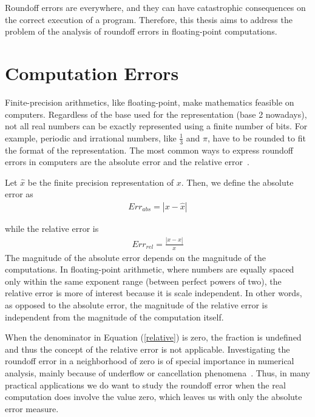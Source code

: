 Roundoff errors are everywhere, and they can have catastrophic consequences on the correct execution of a program.
%
Therefore, this thesis aims to address the problem of the analysis of roundoff errors in floating-point computations.
%
\section{Computation Errors}
%

Finite-precision arithmetics, like floating-point, make mathematics feasible on computers. 
%
Regardless of the base used for the representation (base 2 nowadays), not all real numbers can be exactly represented using a finite number of bits.
%
For example, periodic and irrational numbers, like $\frac{1}{3}$ and $\pi$, have to be rounded to fit the format of the representation. 
%
%
%
The most common ways to express roundoff errors in computers are the absolute error and the relative error~\cite{higham2002accuracy}.
%

Let $\widehat{x}$ be the finite precision representation of $x$. Then, we define the absolute error as
%
\begin{align}
Err_{abs}=|x-\widehat{x}|\label{absolute}
\end{align}
%

while the relative error is
%
\begin{align}
Err_{rel}=\frac{|x-\widehat{x}|}{x}\label{relative}
\end{align}
%
The magnitude of the absolute error depends on the magnitude of the computations.
%
In floating-point arithmetic, where numbers are equally spaced only within the same exponent range (between perfect powers of two), the relative error is more of interest because it is scale independent.
%
In other words, as opposed to the absolute error, the magnitude of the relative error is independent from the magnitude of the computation itself.
%

%
When the denominator in Equation (\ref{relative}) is zero, the fraction is undefined and thus the concept of the relative error is not applicable.
%
Investigating the roundoff error in a neighborhood of zero is of special importance in numerical analysis, mainly because of underflow or cancellation phenomena~\cite{every}. Thus, in many practical applications we do want to study the roundoff error when the real computation does involve the value zero, which leaves us with only the absolute error measure.
%
